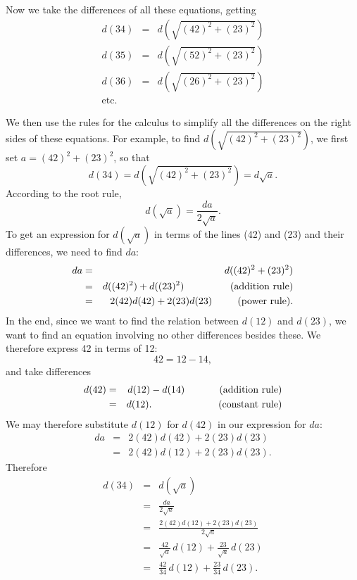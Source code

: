 \documentclass[twoside,openright]{article}
\newlength{\oldjot}
\begin{document}
Now we take the differences of all these equations, getting
\setlength{\jot}{1ex}
\begin{eqnarray*}
d(34) & = &d(\sqrt{(42)^2 + (23)^2})\\
d(35) & = &d( \sqrt{(52)^2 + (23)^2})\\
d(36) & = & d(\sqrt{(26)^2 + (23)^2})\\
\mbox{etc.} & & 
\end{eqnarray*}
\setlength{\jot}{\oldjot}

We then use the rules for the calculus to simplify all the differences
on the right sides of these equations.  For example, to find
$d(\sqrt{(42)^2 + (23)^2})$, we first set $a = (42)^2 + (23)^2$, so
that
$$d(34) = d(\sqrt{(42)^2 + (23)^2}) = d\sqrt{a}.$$
According to the root rule,
$$d(\sqrt{a}) = \frac{da}{2\sqrt{a}}.$$
To get an expression for $d(\sqrt{a})$ in terms of the lines (42) and
(23) and their differences, we need to find $da$:
\setlength{\jot}{1.5ex}
\begin{eqnarray*}
da & = & d((42)^2 + (23)^2) \\
& = & d((42)^2) + d((23)^2) \mbox{\hspace{10.9ex}(addition rule)}\\
& = & 2(42)d(42) + 2(23)d(23) \mbox{\hspace{6ex}(power rule).}
\end{eqnarray*}
\setlength{\jot}{\oldjot}
In the end, since we want to find the relation between $d(12)$ and
$d(23)$, we want to find an equation involving no other differences
besides these.  We therefore express 42 in terms of 12:
$$42 = 12 - 14,$$
and take differences
\begin{eqnarray*}
d(42) & = & d(12) -d(14) \mbox{\hspace{7.4ex} (addition rule)}\\
 & = & d(12). \mbox{\hspace{15ex} (constant rule)}
 \end{eqnarray*}
We may therefore substitute $d(12)$ for $d(42)$ in our expression for $da$:
\setlength{\jot}{1ex}
\begin{eqnarray*}
da & = & 2(42)d(42) + 2(23)d(23)\\
& = & 2(42)d(12) + 2(23)d(23).
\end{eqnarray*}
\setlength{\jot}{\oldjot}
Therefore
\setlength{\jot}{1.5ex}
\begin{eqnarray*}
d(34) & = & d(\sqrt{a})\\
 & = & \frac{da}{2\sqrt{a}}\\
 & = & \frac{2(42)d(12) + 2(23)d(23)}{2\sqrt{a}}\\
 & = & \frac{42}{\sqrt{a}}\,d(12) + \frac{23}{\sqrt{a}}\,d(23)\\
 & = & \frac{42}{34}\,d(12) + \frac{23}{34}\,d(23).
 \end{eqnarray*}
\end{document}
